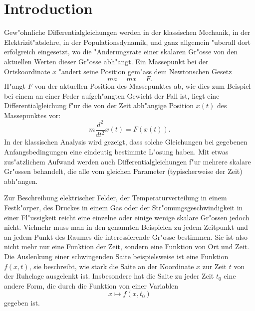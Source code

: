%
%
%
\chapter*{Introduction}
Gew"ohnliche Differentialgleichungen werden in der klassischen Mechanik,
in der Elektrizit"atslehre, in der Populationsdynamik, und ganz 
allgemein "uberall dort erfolgreich eingesetzt, wo die
"Anderungsrate einer skalaren Gr"osse von den aktuellen Werten dieser Gr"osse
abh"angt.
Ein Massepunkt bei der Ortskoordinate $x$ "andert seine Position
gem"ass dem Newtonschen Gesetz
\[
ma=m\ddot x=F.
\]
H"angt $F$ von der aktuellen Position des Massepunktes ab, wie dies zum
Beispiel bei einem an einer Feder aufgeh"angten Gewicht der Fall ist,
liegt eine Differentialgleichung f"ur die von der Zeit abh"angige
Position $x(t)$ des Massepunktes vor:
\[
m\frac{d^2}{dt^2}x(t)=F(x(t)).
\]
In der klassischen Analysis wird gezeigt, dass solche Gleichungen bei
gegebenen Anfangsbedingungen eine eindeutig bestimmte L"osung haben.
Mit etwas zus"atzlichem Aufwand werden auch Differentialgleichungen
f"ur mehrere skalare Gr"ossen behandelt, die alle vom gleichen Parameter
(typischerweise der Zeit) abh"angen.

Zur Beschreibung elektrischer Felder, der Temperaturverteilung in
einem Fest\-k"orper, des Druckes in einem Gas oder der Str"omungsgeschwindigkeit
in einer Fl"ussigkeit reicht eine einzelne oder einige wenige skalare
Gr"ossen jedoch nicht. Vielmehr muss man in den genannten Beispielen
zu jedem Zeitpunkt und an jedem Punkt des Raumes die interessierende Gr"osse
bestimmen. Sie ist also nicht mehr nur eine Funktion der Zeit, sondern eine
Funktion von Ort und Zeit.
Die Auslenkung einer schwingenden Saite
beispielsweise ist eine Funktion $f(x,t)$, sie beschreibt, wie stark
die Saite an der Koordinate $x$ zur Zeit $t$ von der Ruhelage ausgelenkt ist.
Insbesondere hat die Saite zu jeder Zeit $t_0$ eine andere Form, die durch
die Funktion von einer Variablen
\[
x\mapsto f(x,t_0)
\]
gegeben ist.

